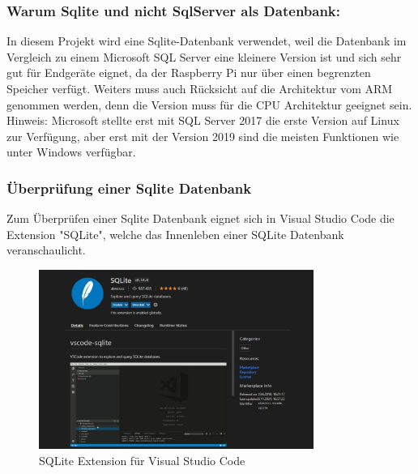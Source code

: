 \subsubsection*{Warum Sqlite und nicht SqlServer als Datenbank:}

In diesem Projekt wird eine Sqlite-Datenbank verwendet, weil die Datenbank im Vergleich zu einem Microsoft SQL Server eine kleinere
Version ist und sich sehr gut für Endgeräte eignet, da der Raspberry Pi nur über einen begrenzten Speicher verfügt.
Weiters muss auch Rücksicht auf die Architektur vom ARM genommen werden, denn die Version muss für die CPU Architektur geeignet sein.
Hinweis: Microsoft stellte erst mit SQL Server 2017 die erste Version auf Linux zur Verfügung, aber erst mit der Version 2019 sind die meisten
Funktionen wie unter Windows verfügbar.

\subsubsection*{Überprüfung einer Sqlite Datenbank}
Zum Überprüfen einer Sqlite Datenbank eignet sich in Visual Studio Code die Extension "SQLite", 
welche das Innenleben einer SQLite Datenbank veranschaulicht.

\begin{figure}[H]
    \centering
    \includegraphics[width=0.8\textwidth]{./pics/SQLiteVSCodeExtension.JPG}
    \caption{SQLite Extension für Visual Studio Code}
\end{figure}

